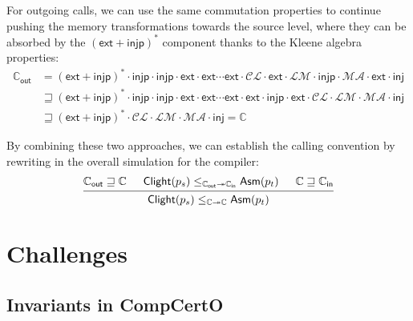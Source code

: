 \documentclass[11pt]{article}
\begin{document}
For outgoing calls,
we can use the same commutation properties
to continue pushing the memory transformations
towards the source level,
where they can be absorbed
by the $(\mathsf{ext} + \mathsf{injp})^*$ component
thanks to the Kleene algebra properties:
\begin{align*}
  \mathbb{C}_\mathsf{out}
  &=
    (\mathsf{ext} + \mathsf{injp})^* \cdot
    \mathsf{injp} \cdot
    \mathsf{injp} \cdot
    \mathsf{ext} \cdot
    \mathsf{ext} \cdots
    \mathsf{ext} \cdot
    \mathcal{C\!L} \cdot
    \mathsf{ext} \cdot
    \mathcal{L\!M} \cdot
    \mathsf{injp} \cdot
    \mathcal{M\!A} \cdot
    \mathsf{ext} \cdot
    \mathsf{inj} \\
  &\sqsupseteq
    (\mathsf{ext} + \mathsf{injp})^* \cdot
    \mathsf{injp} \cdot
    \mathsf{injp} \cdot
    \mathsf{ext} \cdot
    \mathsf{ext} \cdots
    \mathsf{ext} \cdot
    \mathsf{ext} \cdot
    \mathsf{injp} \cdot
    \mathsf{ext} \cdot
    \mathcal{C\!L} \cdot
    \mathcal{L\!M} \cdot
    \mathcal{M\!A} \cdot
    \mathsf{inj} \\
  &\sqsupseteq
    (\mathsf{ext} + \mathsf{injp})^* \cdot
    \mathcal{C\!L} \cdot
    \mathcal{L\!M} \cdot
    \mathcal{M\!A} \cdot
    \mathsf{inj}
  = \mathbb{C}
\end{align*}

By combining these two approaches,
we can establish the calling convention
by rewriting in the overall simulation for the compiler:
\[
  \begin{prooftree}
    \hypo{\mathbb{C}_\mathsf{out} \sqsupseteq \mathbb{C}}
    \hypo{\mathsf{Clight}(p_s)
          \le_{\mathbb{C}_\mathsf{out} \twoheadrightarrow \mathbb{C}_\mathsf{in}}
          \mathsf{Asm}(p_t)}
    \hypo{\mathbb{C} \sqsupseteq \mathbb{C}_\mathsf{in}}
    \infer3{\mathsf{Clight}(p_s)
          \le_{\mathbb{C} \twoheadrightarrow \mathbb{C}}
          \mathsf{Asm}(p_t)}
  \end{prooftree}
\]

\section{Challenges}

\subsection{Invariants in CompCertO}
\end{document}
